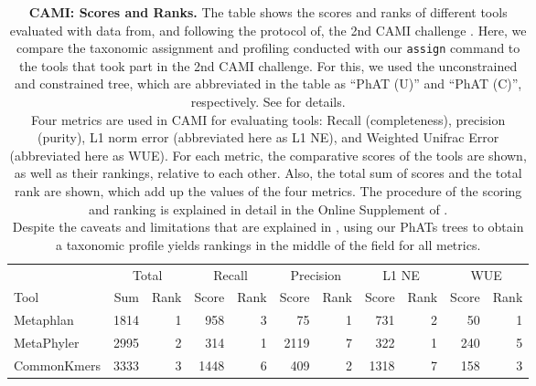 \begin{table}[htb]
\caption[CAMI: Scores and Ranks]{
\textbf{CAMI: Scores and Ranks.}
The table shows the scores and ranks of different tools evaluated with data from, and following the protocol of,
the 2nd CAMI challenge \citep{Sczyrba2017,Bremges2018}.
Here, we compare the taxonomic assignment and profiling conducted with our \texttt{assign} command
to the tools that took part in the 2nd CAMI challenge.
For this, we used the unconstrained and constrained  tree,
which are abbreviated in the table as ``PhAT (U)'' and ``PhAT (C)'', respectively.
See  for details.
\\
Four metrics are used in CAMI for evaluating tools:
Recall (completeness), precision (purity), L1 norm error (abbreviated here as L1 NE),
and Weighted Unifrac Error (abbreviated here as WUE).
For each metric, the comparative scores of the tools are shown, as well as their rankings, relative to each other.
Also, the total sum of scores and the total rank are shown, which add up the values of the four metrics.
The procedure of the scoring and ranking is explained in detail in the Online Supplement of \cite{Sczyrba2017}.
\\
Despite the caveats and limitations that are explained in ,
using our \acp{PhAT} trees to obtain a taxonomic profile yields rankings in the middle of the field for all metrics.
}
\label{tab:cami_rankings}
{
    \begin{center}
    \begin{tabular}{lrrrrrrrrrr}
        \toprule
                       & \multicolumn{2}{c}{Total} & \multicolumn{2}{c}{Recall} & \multicolumn{2}{c}{Precision} & \multicolumn{2}{c}{L1 NE} & \multicolumn{2}{c}{WUE} \\
        Tool           & Sum & Rank & Score & Rank & Score & Rank & Score & Rank & Score & Rank \\
        \midrule
        Metaphlan           &   1814    &   1   &   958     &   3   &  75       &   1   &  731      &   2   & 50    &   1   \\
        MetaPhyler          &   2995    &   2   &   314     &   1   &  2119     &   7   &  322      &   1   & 240   &   5   \\
        CommonKmers         &   3333    &   3   &   1448    &   6   &  409      &   2   &  1318     &   7   & 158   &   3   \\

\end{tabular}
\end{center}}
\end{table}
